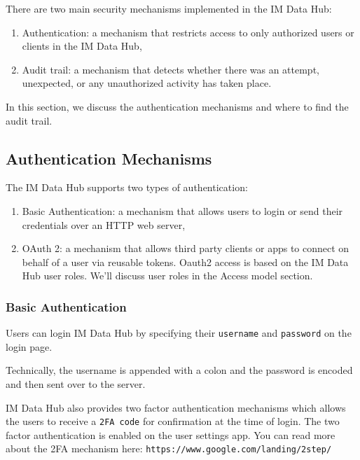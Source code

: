 \documentclass[]{book}
\providecommand{\tightlist}{%
  \setlength{\itemsep}{0pt}\setlength{\parskip}{0pt}}
\begin{document}
There are two main security mechanisms implemented in the IM Data Hub:

\begin{enumerate}
\def\labelenumi{\arabic{enumi}.}
\tightlist
\item
  Authentication: a mechanism that restricts access to only authorized users or clients in the IM Data Hub,
\item
  Audit trail: a mechanism that detects whether there was an attempt, unexpected, or any unauthorized activity has taken place.
\end{enumerate}

In this section, we discuss the authentication mechanisms and where to find the audit trail.

\hypertarget{authentication-mechanisms}{%
\subsection{Authentication Mechanisms}\label{authentication-mechanisms}}

The IM Data Hub supports two types of authentication:

\begin{enumerate}
\def\labelenumi{\arabic{enumi}.}
\tightlist
\item
  Basic Authentication: a mechanism that allows users to login or send their credentials over an HTTP web server,
\item
  OAuth 2: a mechanism that allows third party clients or apps to connect on behalf of a user via reusable tokens. Oauth2 access is based on the IM Data Hub user roles. We'll discuss user roles in the Access model section.
\end{enumerate}

\hypertarget{basic-authentication}{%
\subsubsection{Basic Authentication}\label{basic-authentication}}

Users can login IM Data Hub by specifying their \texttt{username} and \texttt{password} on the login page.

Technically, the username is appended with a colon and the password is encoded and then sent over to the server.

IM Data Hub also provides two factor authentication mechanisms which allows the users to receive a \texttt{2FA\ code} for confirmation at the time of login. The two factor authentication is enabled on the user settings app. You can read more about the 2FA mechanism here: \texttt{https://www.google.com/landing/2step/}
\end{document}
